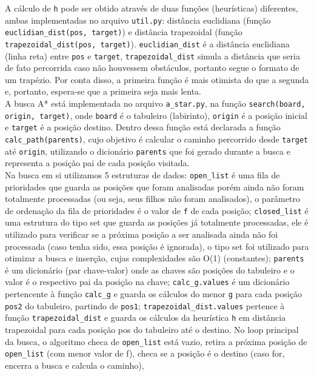 \documentclass[12pt]{article}
\begin{document}
A cálculo de \verb|h| pode ser obtido através de duas funções (heurísticas) diferentes, ambas implementadas no arquivo \verb|util.py|: distância euclidiana (função \verb|euclidian_dist(pos, target)|) e distância trapezoidal (função \verb|trapezoidal_dist(pos, target)|). \verb|euclidian_dist| é a distância euclidiana (linha reta) entre \verb|pos| e \verb|target|, \verb|trapezoidal_dist| simula a distância que seria de fato percorrida caso não houvessem obstáculos, portanto segue o formato de um trapézio. Por conta disso, a primeira função é mais otimista do que a segunda e, portanto, espera-se que a primeira seja mais lenta.\\

A busca A* está implementada no arquivo \verb|a_star.py|, na função \verb|search(board, origin, target)|, onde \verb|board| é o tabuleiro (labirinto), \verb|origin| é a posição inicial e \verb|target| é a posição destino. Dentro dessa função está declarada a função \verb|calc_path(parents)|, cujo objetivo é calcular o caminho percorrido desde \verb|target| até \verb|origin|, utilizando o dicionário \verb|parents| que foi gerado durante a busca e representa a posição pai de cada posição visitada.\\

Na busca em si utilizamos 5 estruturas de dados: \verb|open_list| é uma fila de prioridades que guarda as posições que foram analisadas porém ainda não foram totalmente processadas (ou seja, seus filhos não foram analisados), o parâmetro de ordenação da fila de prioridades é o valor de \verb|f| de cada posição; \verb|closed_list| é uma estrutura do tipo set que guarda as posições já totalmente processadas, ele é utilizado para verificar se a próxima posição a ser analisada ainda não foi processada (caso tenha sido, essa posição é ignorada), o tipo set foi utilizado para otimizar a busca e inserção, cujas complexidades são O(1) (constantes); \verb|parents| é um dicionário (par chave-valor) onde as chaves são posições do tabuleiro e o valor é o respectivo pai da posição na chave; \verb|calc_g.values| é um dicionário pertencente à função \verb|calc_g| e guarda os cálculos do menor \verb|g| para cada posição \verb|pos2| do tabuleiro, partindo de \verb|pos1|; \verb|trapezoidal_dist.values| pertence à função \verb|trapezoidal_dist| e guarda os cálculos da heurística \verb|h| em distância trapezoidal para cada posição pos do tabuleiro até o destino. No loop principal da busca, o algoritmo checa de \verb|open_list| está vazio, retira a próxima posição de \verb|open_list| (com menor valor de f), checa se a posição é o destino (caso for, encerra a busca e calcula o caminho),
\end{document}
